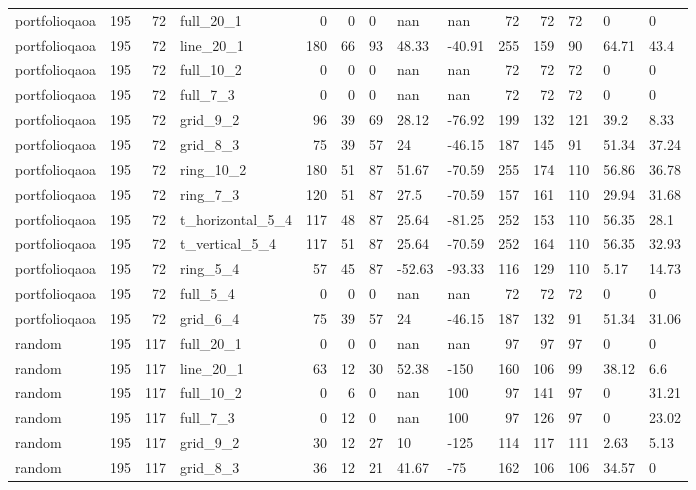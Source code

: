 \begin{longtable}{lrrlrrlllrrlll}
portfolioqaoa & 195 & 72 & full\_20\_1 & 0 & 0 & 0 & nan & nan & 72 & 72 & 72 & 0 & 0 \\
portfolioqaoa & 195 & 72 & line\_20\_1 & 180 & 66 & 93 & 48.33 & -40.91 & 255 & 159 & 90 & 64.71 & 43.4 \\
portfolioqaoa & 195 & 72 & full\_10\_2 & 0 & 0 & 0 & nan & nan & 72 & 72 & 72 & 0 & 0 \\
portfolioqaoa & 195 & 72 & full\_7\_3 & 0 & 0 & 0 & nan & nan & 72 & 72 & 72 & 0 & 0 \\
portfolioqaoa & 195 & 72 & grid\_9\_2 & 96 & 39 & 69 & 28.12 & -76.92 & 199 & 132 & 121 & 39.2 & 8.33 \\
portfolioqaoa & 195 & 72 & grid\_8\_3 & 75 & 39 & 57 & 24 & -46.15 & 187 & 145 & 91 & 51.34 & 37.24 \\
portfolioqaoa & 195 & 72 & ring\_10\_2 & 180 & 51 & 87 & 51.67 & -70.59 & 255 & 174 & 110 & 56.86 & 36.78 \\
portfolioqaoa & 195 & 72 & ring\_7\_3 & 120 & 51 & 87 & 27.5 & -70.59 & 157 & 161 & 110 & 29.94 & 31.68 \\
portfolioqaoa & 195 & 72 & t\_horizontal\_5\_4 & 117 & 48 & 87 & 25.64 & -81.25 & 252 & 153 & 110 & 56.35 & 28.1 \\
portfolioqaoa & 195 & 72 & t\_vertical\_5\_4 & 117 & 51 & 87 & 25.64 & -70.59 & 252 & 164 & 110 & 56.35 & 32.93 \\
portfolioqaoa & 195 & 72 & ring\_5\_4 & 57 & 45 & 87 & -52.63 & -93.33 & 116 & 129 & 110 & 5.17 & 14.73 \\
portfolioqaoa & 195 & 72 & full\_5\_4 & 0 & 0 & 0 & nan & nan & 72 & 72 & 72 & 0 & 0 \\
portfolioqaoa & 195 & 72 & grid\_6\_4 & 75 & 39 & 57 & 24 & -46.15 & 187 & 132 & 91 & 51.34 & 31.06 \\
random & 195 & 117 & full\_20\_1 & 0 & 0 & 0 & nan & nan & 97 & 97 & 97 & 0 & 0 \\
random & 195 & 117 & line\_20\_1 & 63 & 12 & 30 & 52.38 & -150 & 160 & 106 & 99 & 38.12 & 6.6 \\
random & 195 & 117 & full\_10\_2 & 0 & 6 & 0 & nan & 100 & 97 & 141 & 97 & 0 & 31.21 \\
random & 195 & 117 & full\_7\_3 & 0 & 12 & 0 & nan & 100 & 97 & 126 & 97 & 0 & 23.02 \\
random & 195 & 117 & grid\_9\_2 & 30 & 12 & 27 & 10 & -125 & 114 & 117 & 111 & 2.63 & 5.13 \\
random & 195 & 117 & grid\_8\_3 & 36 & 12 & 21 & 41.67 & -75 & 162 & 106 & 106 & 34.57 & 0 \\

\end{longtable}
